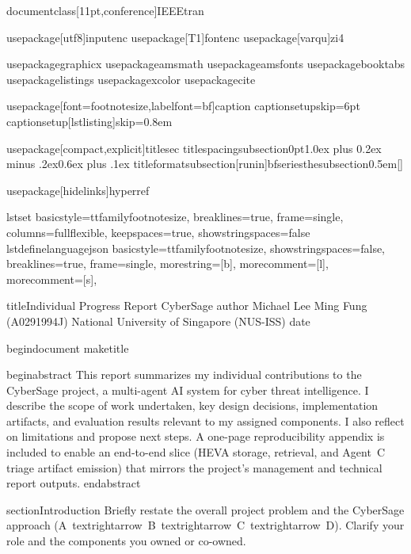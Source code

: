 documentclass[11pt,conference]{IEEEtran}

usepackage[utf8]{inputenc}
usepackage[T1]{fontenc}
usepackage[varqu]{zi4} %

usepackage{graphicx}
usepackage{amsmath}
usepackage{amsfonts}
usepackage{booktabs}
usepackage{listings}
usepackage{xcolor}
usepackage{cite} %

usepackage[font=footnotesize,labelfont=bf]{caption}
captionsetup{skip=6pt}
captionsetup[lstlisting]{skip=0.8em}

usepackage[compact,explicit]{titlesec}
titlespacing{subsection}{0pt}{1.0ex plus 0.2ex minus .2ex}{0.6ex plus .1ex}
titleformat{subsection}[runin]{bfseries}{thesubsection}{0.5em}{}[]

usepackage[hidelinks]{hyperref}

lstset{
	basicstyle=ttfamilyfootnotesize,
	breaklines=true,
	frame=single,
	columns=fullflexible,
	keepspaces=true,
	showstringspaces=false
}
lstdefinelanguage{json}{
	basicstyle=ttfamilyfootnotesize,
	showstringspaces=false,
	breaklines=true,
	frame=single,
	morestring=[b],
	morecomment=[l]{},
	morecomment=[s]{}{},
}

title{Individual Progress Report CyberSage}
author{
	Michael Lee Ming Fung (A0291994J)
	National University of Singapore (NUS-ISS)
}
date{}

begin{document}
maketitle

begin{abstract}
This report summarizes my individual contributions to the CyberSage project, a multi-agent AI system for cyber threat intelligence. I describe the scope of work undertaken, key design decisions, implementation artifacts, and evaluation results relevant to my assigned components. I also reflect on limitations and propose next steps. A one-page reproducibility appendix is included to enable an end-to-end slice (HEVA storage, retrieval, and Agent~C triage artifact emission) that mirrors the project’s management and technical report outputs.
end{abstract}

section{Introduction}
Briefly restate the overall project problem and the CyberSage approach (A~textrightarrow~B~textrightarrow~C~textrightarrow~D). Clarify your role and the components you owned or co-owned.


